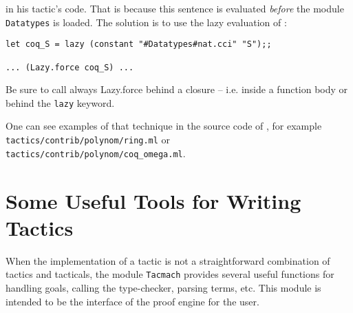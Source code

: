 in his tactic's code. That is because this sentence is evaluated
\emph{before} the module \texttt{Datatypes} is loaded. The solution is
to use the lazy evaluation of \ocaml{}:


\begin{verbatim}
let coq_S = lazy (constant "#Datatypes#nat.cci" "S");;

... (Lazy.force coq_S) ...
\end{verbatim}


Be sure to call always Lazy.force behind a closure -- i.e. inside a
function body or behind the \texttt{lazy} keyword.

One can see examples of that technique in the source code of \Coq{},
for example 
\verb+tactics/contrib/polynom/ring.ml+ or 
\verb+tactics/contrib/polynom/coq_omega.ml+.

\section[Some Useful Tools for Writing Tactics]{Some Useful Tools for Writing Tactics\label{SomeUsefulToolsforWrittingTactics}}
When the implementation of a tactic is not a straightforward
combination of tactics and tacticals, the module \texttt{Tacmach}
provides several useful functions for handling goals, calling the
type-checker, parsing terms, etc. This module is intended to be 
the interface of the proof engine for the user.


